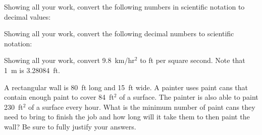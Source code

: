 \documentclass[12pt,letterpaper]{exam}
\begin{document}
\begin{questions}
\newpage
\question Showing all your work, convert the following numbers in scientific notation to decimal values:



\newpage
\question Showing all your work, convert the following decimal numbers to scientific notation: 



\newpage
\question[10] Showing all your work, convert 9.8~km/hr$^2$ to ft per square second. Note that 1~m is 3.28084~ft.



\newpage
\question[10] A rectangular wall is 80~ft long and 15~ft wide. A painter uses paint cans that contain enough paint to cover 84~ft$^2$ of a surface. The painter is also able to paint 230~ft$^2$ of a surface every hour. What is the minimum number of paint cans they need to bring to finish the job and how long will it take them to then paint the wall? Be sure to fully justify your answers. 


\end{questions}
\end{document}
